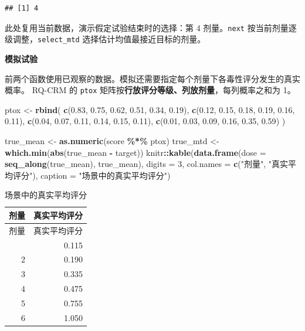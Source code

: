 \documentclass[
  chinese,
]{article}
\newenvironment{Shaded}{\begin{snugshade}}{\end{snugshade}}
\newcommand{\AttributeTok}[1]{\textcolor[rgb]{0.13,0.29,0.53}{#1}}
\newcommand{\DecValTok}[1]{\textcolor[rgb]{0.00,0.00,0.81}{#1}}
\newcommand{\FloatTok}[1]{\textcolor[rgb]{0.00,0.00,0.81}{#1}}
\newcommand{\FunctionTok}[1]{\textcolor[rgb]{0.13,0.29,0.53}{\textbf{#1}}}
\newcommand{\NormalTok}[1]{#1}
\newcommand{\OtherTok}[1]{\textcolor[rgb]{0.56,0.35,0.01}{#1}}
\newcommand{\SpecialCharTok}[1]{\textcolor[rgb]{0.81,0.36,0.00}{\textbf{#1}}}
\newcommand{\StringTok}[1]{\textcolor[rgb]{0.31,0.60,0.02}{#1}}
\begin{document}
\begin{verbatim}
## [1] 4
\end{verbatim}

此处复用当前数据，演示假定试验结束时的选择：第 4 剂量。\texttt{next}
按当前剂量逐级调整，\texttt{select\_mtd} 选择估计均值最接近目标的剂量。

\textbf{模拟试验}

前两个函数使用已观察的数据。模拟还需要指定每个剂量下各毒性评分发生的真实概率。
RQ-CRM 的 \texttt{ptox}
矩阵按\textbf{行放评分等级、列放剂量}，每列概率之和为 1。

\begin{Shaded}
\begin{Highlighting}[]
\NormalTok{ptox }\OtherTok{\textless{}{-}} \FunctionTok{rbind}\NormalTok{(}
  \FunctionTok{c}\NormalTok{(}\FloatTok{0.83}\NormalTok{, }\FloatTok{0.75}\NormalTok{, }\FloatTok{0.62}\NormalTok{, }\FloatTok{0.51}\NormalTok{, }\FloatTok{0.34}\NormalTok{, }\FloatTok{0.19}\NormalTok{),}
  \FunctionTok{c}\NormalTok{(}\FloatTok{0.12}\NormalTok{, }\FloatTok{0.15}\NormalTok{, }\FloatTok{0.18}\NormalTok{, }\FloatTok{0.19}\NormalTok{, }\FloatTok{0.16}\NormalTok{, }\FloatTok{0.11}\NormalTok{),}
  \FunctionTok{c}\NormalTok{(}\FloatTok{0.04}\NormalTok{, }\FloatTok{0.07}\NormalTok{, }\FloatTok{0.11}\NormalTok{, }\FloatTok{0.14}\NormalTok{, }\FloatTok{0.15}\NormalTok{, }\FloatTok{0.11}\NormalTok{),}
  \FunctionTok{c}\NormalTok{(}\FloatTok{0.01}\NormalTok{, }\FloatTok{0.03}\NormalTok{, }\FloatTok{0.09}\NormalTok{, }\FloatTok{0.16}\NormalTok{, }\FloatTok{0.35}\NormalTok{, }\FloatTok{0.59}\NormalTok{)}
\NormalTok{)}

\NormalTok{true\_mean }\OtherTok{\textless{}{-}} \FunctionTok{as.numeric}\NormalTok{(score }\SpecialCharTok{\%*\%}\NormalTok{ ptox)}
\NormalTok{true\_mtd }\OtherTok{\textless{}{-}} \FunctionTok{which.min}\NormalTok{(}\FunctionTok{abs}\NormalTok{(true\_mean }\SpecialCharTok{{-}}\NormalTok{ target))}
\NormalTok{knitr}\SpecialCharTok{::}\FunctionTok{kable}\NormalTok{(}\FunctionTok{data.frame}\NormalTok{(}\AttributeTok{dose =} \FunctionTok{seq\_along}\NormalTok{(true\_mean), true\_mean),}
             \AttributeTok{digits =} \DecValTok{3}\NormalTok{, }\AttributeTok{col.names =} \FunctionTok{c}\NormalTok{(}\StringTok{"剂量"}\NormalTok{, }\StringTok{"真实平均评分"}\NormalTok{),}
             \AttributeTok{caption =} \StringTok{"场景中的真实平均评分"}\NormalTok{)}
\end{Highlighting}
\end{Shaded}

\begin{longtable}[]{@{}rr@{}}
\caption{场景中的真实平均评分}\tabularnewline
\toprule\noalign{}
剂量 & 真实平均评分 \\
\midrule\noalign{}
\endfirsthead
\toprule\noalign{}
剂量 & 真实平均评分 \\
\midrule\noalign{}
\endhead
\bottomrule\noalign{}
\endlastfoot
1 & 0.115 \\
2 & 0.190 \\
3 & 0.335 \\
4 & 0.475 \\
5 & 0.755 \\
6 & 1.050 \\
\end{longtable}
\end{document}
